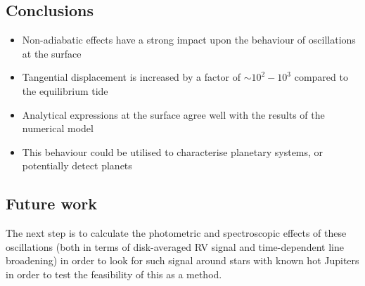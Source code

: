 \documentclass[a0,portrait]{a0poster}
\begin{document}
\begin{multicols}{2}
\begin{tcolorbox}[colframe=black,colback=blue!10!white]
\vspace{0.5cm}

\end{tcolorbox}


\color{Black}

\begin{tcolorbox}[colframe=black,colback=blue!10!white]

\vspace{0.5cm}

\section*{Conclusions}

\begin{itemize}
\item Non-adiabatic effects have a strong impact upon the behaviour of oscillations at the surface
\item Tangential displacement is increased by a factor of $\sim 10^{2} - 10^{3}$ compared to the equilibrium tide
\item Analytical expressions at the surface agree well with the results of the numerical model
\item This behaviour could be utilised to characterise planetary systems, or potentially detect planets
\end{itemize}
\vspace{0.5cm}

\end{tcolorbox}

\color{Black} %

\begin{tcolorbox}[colframe=black,colback=blue!10!white]

\section*{Future work}
\vspace{-0.5cm}
The next step is to calculate the photometric and spectroscopic effects of these oscillations (both in terms of disk-averaged RV signal and time-dependent line broadening) in order to look for such signal around stars with known hot Jupiters in order to test the feasibility of this as a method.


\end{tcolorbox}
\end{multicols}
\end{document}
